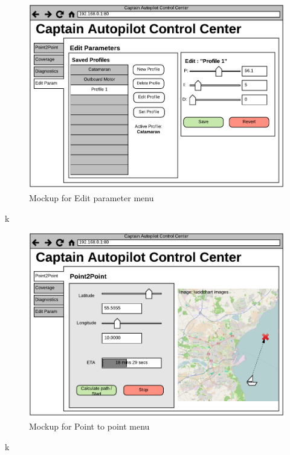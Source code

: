 \begin{figure}[H]
	\centering
	\includegraphics[width=1\linewidth]{Images/Design/UI_Mockup_Edit_param.pdf}
	\caption{Mockup for Edit parameter menu}
\end{figure}

k

\begin{figure}[H]
	\centering
	\includegraphics[width=1\linewidth]{Images/Design/UI_Mockup_Point_to_point.pdf}
	\caption{Mockup for Point to point menu}
\end{figure}

k

